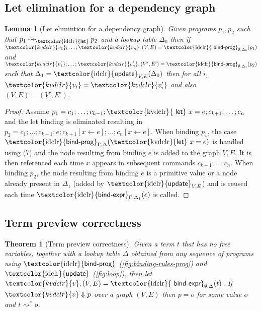 \documentclass[english,crc,references=cleveref]{programming}
\newcounter{thc}
\theoremstyle{plain}
\newtheorem{lem}[thc]{Lemma}
\newtheorem{theorem}[thc]{Theorem}
\theoremstyle{definition}
\newcommand{\ident}[1]{\textnormal{\textcolor{idclr}{\sffamily #1}}}
\newcommand{\kvd}[1]{\textnormal{\textcolor{kvdclr}{\sffamily #1}}}
\newcommand{\bndclr}[1]{\textcolor{kvdclr}{#1}}
\begin{document}
\subsection{Let elimination for a dependency graph}
\label{sec:app-let-grp-elimination}

\begin{lem}[Let elimintion for a dependency graph]
\label{thm:app-let-grp-elimination}
Given programs $p_1, p_2$ such that $p_1 \rightsquigarrow_\ident{let} p_2$ and a lookup table
$\Delta_0$ then if $\bndclr{v_1}; \ldots; \bndclr{v_n}, (V, E) = \ident{bind-prog}_{\emptyset, \Delta_0}(p_1)$ and
$\bndclr{v'_1};\ldots;\bndclr{v'_n}, (V', E') = \ident{bind-prog}_{\emptyset, \Delta_1}(p_2)$ such that $\Delta_1 = \ident{update}_{V, E}(\Delta_0)$
then for all $i$, $\bndclr{v_i} = \bndclr{v'_i}$ and also $(V, E) = (V', E')$.
\end{lem}
\begin{proof}
Assume $p_1 = c_1; \ldots; c_{k-1}; \kvd{let}~x=e; c_{k+1};\ldots; c_n$ and the let binding is
eliminated resulting in $p_2 = c_1; \ldots; c_{k-1}; e; c_{k+1}[x\leftarrow e];\ldots; c_n[x\leftarrow e]$.
When binding $p_1$, the case $\ident{bind-prog}_{\Gamma,\Delta}(\kvd{let}~x=e)$ is handled using (7)
and the node resulting from binding $e$ is added to the graph $V, E$. It is then referenced each
time $x$ appears in subsequent commands $c_{k+1}; \ldots; c_n$.
When binding $p_2$, the node resulting from binding $e$ is a primitive value or a node already
present in $\Delta_1$ (added by $\ident{update}_{V, E}$) and is reused each time
$\ident{bind-expr}_{\Gamma,\Delta_1}(e)$ is called.
\end{proof}


\subsection{Term preview correctness}
\label{sec:app-correctness}

\begin{theorem}[Term preview correctness]
Given a term $t$ that has no free variables, together with a lookup table $\Delta$ obtained
from any sequence of programs using $\ident{bind-prog}$ (\cref{fig:binding-rules-prog}) and
$\ident{update}$ (\cref{fig:loop}), then
let $\bndclr{v}, (V, E) = \ident{bind-expr}_{\emptyset, \Delta}(t)$. If $\bndclr{v}\Downarrow p$
over a graph $(V, E)$ then $p = o$ for some value $o$ and $t \rightsquigarrow^{*} o$.
\end{theorem}
\end{document}
